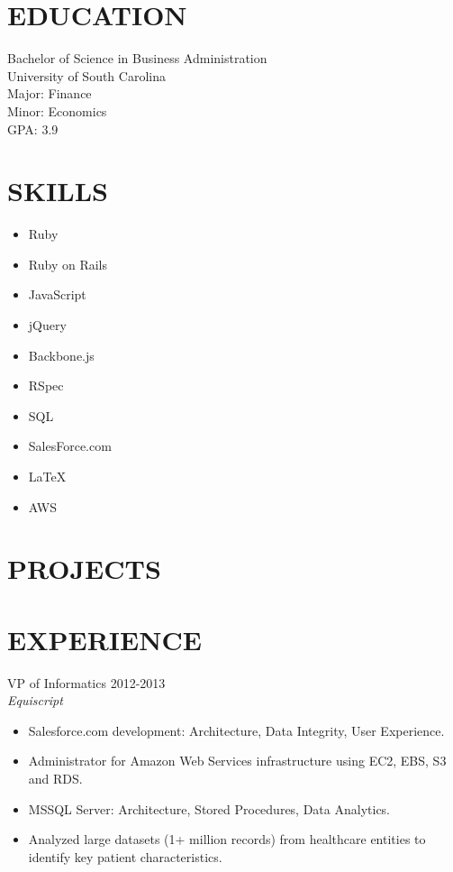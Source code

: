\documentclass[line, margin]{res}
\begin{document}
\address{San Francisco Bay Area\\ (843) 696-9395\\ drew.kowalik@gmail.com}

\begin{resume}
\section{EDUCATION}
 Bachelor of Science in Business Administration\\
 University of South Carolina\\
 Major: Finance\\
 Minor: Economics\\
 GPA: 3.9
 
\section{SKILLS}
\begin{multicols}{4}
\begin{itemize}[leftmargin=10pt]
\item Ruby
\item Ruby on Rails
\item JavaScript
\item jQuery
\item Backbone.js
\item RSpec
\item SQL
\item SalesForce.com
\item \LaTeX
\item AWS
\end{itemize}
\end{multicols}

\section{PROJECTS}


\section{EXPERIENCE}
{\large VP of Informatics} \hfill 2012-2013\\
\textit{Equiscript}
\begin{itemize}[leftmargin=10pt]
\item Salesforce.com development: Architecture, Data Integrity, User Experience. 
\item Administrator for Amazon Web Services infrastructure using EC2, EBS, S3 and RDS.
\item MSSQL Server: Architecture, Stored Procedures, Data Analytics.
\item Analyzed large datasets (1+ million records) from healthcare entities to identify key patient characteristics.
\end{itemize}


\end{resume}
\end{document}
